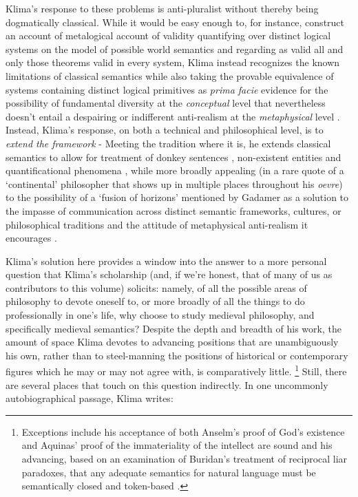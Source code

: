 \documentclass[]{article}
\begin{document}
Klima's response to these problems is anti-pluralist 
without thereby being dogmatically classical. 
While it would be easy enough to, for instance, 
construct an account of metalogical account of validity quantifying over distinct logical systems on the model of possible world semantics and regarding as valid all and only those theorems valid in every system, 
Klima instead recognizes the known limitations of classical semantics 
while also taking the provable equivalence of systems containing distinct logical primitives
as \emph{prima facie} evidence for the possibility of fundamental diversity at the \emph{conceptual} level 
that nevertheless doesn't entail a despairing or indifferent anti-realism at the \emph{metaphysical} level \autocite{Klima2012}.
Instead, Klima's response, on both a technical and philosophical level, 
is to \emph{extend the framework} -
Meeting the tradition where it is, he extends classical semantics to allow for treatment of 
donkey sentences \autocite{Klima1988,Klima2010}, 
non-existent entities \autocite{Klima2001}
and quantificational phenomena \autocite{KlimaSandu1990},
while more broadly appealing (in a rare quote of a `continental' philosopher that shows up in multiple places throughout his \emph{oevre}) 
to the possibility of a `fusion of horizons' mentioned by Gadamer 
as a solution to the impasse of communication across distinct semantic frameworks, cultures, or philosophical traditions and the attitude of metaphysical anti-realism it encourages \autocite{Klima2000,Klima2009a}.

Klima's solution here provides a window into the answer to a more personal question that Klima's scholarship 
(and, if we're honest, that of many of us as contributors to this volume) solicits: 
namely, of all the possible areas of philosophy to devote oneself to, 
or more broadly of all the things to do professionally in one's life, 
why choose to study medieval philosophy, 
and specifically medieval semantics?
Despite the depth and breadth of his work, 
the amount of space Klima devotes to advancing positions that are unambiguously his own, 
rather than to steel-manning the positions of historical or contemporary figures 
which he may or may not agree with,
is comparatively little.
\footnote{Exceptions include his acceptance of both Anselm's proof of God's existence and Aquinas' proof of the immateriality of the intellect are sound \autocite{Klima2000,Klima2009a} 
	and his advancing, 
	based on an examination of Buridan's treatment of reciprocal liar paradoxes, 
	that any adequate semantics for natural language must be semantically closed and token-based \autocite{Klima2004}.} 
Still, there are several places that touch on this question indirectly. 
In one uncommonly autobiographical passage, Klima writes: 
\end{document}
